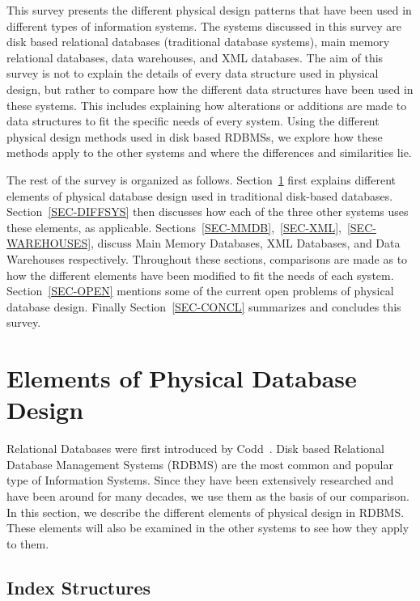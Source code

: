 \documentclass[12pt,a4paper]{article}
\begin{document}
This survey presents the different physical design patterns that have been used in different types of information systems. The systems discussed in this survey
are disk based relational databases (traditional database systems), main memory relational databases, data warehouses, and XML databases. The aim of this survey
is not to explain the details of every data structure used in physical design, but rather to compare how the different data structures have been used in these
systems. This includes explaining how alterations or additions are made to data structures to fit the specific needs of every system. Using the different
physical design methods used in disk based
RDBMSs, we explore how these methods apply to the other systems and where the differences and similarities lie. 


The rest of the survey is organized as follows. Section~\ref{SEC-ELEMENTS} first explains different elements of physical database design used in traditional
disk-based databases. Section~\ref{SEC-DIFFSYS} then discusses how each of the three other systems uses these elements, as
applicable. Sections~\ref{SEC-MMDB},~\ref{SEC-XML},~\ref{SEC-WAREHOUSES}, discuss Main Memory Databases, XML Databases, and Data Warehouses
respectively. Throughout these sections, comparisons are made as to how the different elements have been modified to fit the needs of each system.
Section~\ref{SEC-OPEN} mentions some of the current
open problems of physical database design. Finally Section~\ref{SEC-CONCL} summarizes and concludes this survey.

\section{Elements of Physical Database Design}
\label{SEC-ELEMENTS}


Relational Databases were first introduced by Codd~\cite{codd1970relational}. Disk based Relational Database Management Systems (RDBMS) are the most common and
popular
type of Information Systems. Since they have been extensively researched and have been around for many decades, we use them as the basis of our comparison. In
this section, we describe the different elements of physical design in RDBMS. These elements will also be examined in the other systems to see how they apply
to them.

\subsection{Index Structures}
\end{document}
